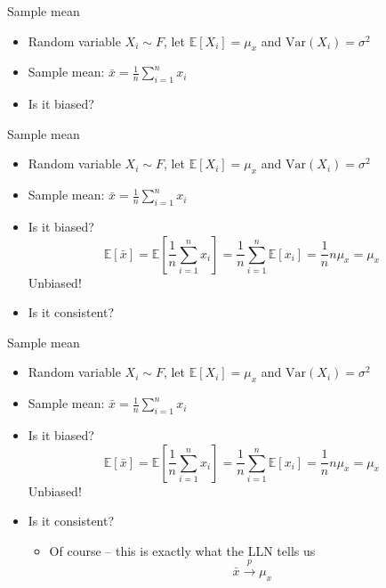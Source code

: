 \documentclass[aspectratio=169]{beamer}
\begin{document}
\begin{frame}{Sample mean}
    \begin{itemize}
        \item Random variable $X_i \sim F$, let $\mathbb{E} [X_i] = \mu_x$ and $\text{Var}(X_i) = \sigma^2$
        \item Sample mean: $\bar{x} = \frac{1}{n} \sum_{i=1}^n x_i$
        \item Is it biased?
    \end{itemize}
\end{frame}

\begin{frame}{Sample mean}
    \begin{itemize}
        \item Random variable $X_i \sim F$, let $\mathbb{E} [X_i] = \mu_x$ and $\text{Var}(X_i) = \sigma^2$
        \item Sample mean: $\bar{x} = \frac{1}{n} \sum_{i=1}^n x_i$
        \item Is it biased?
        $$
        \mathbb{E}[\bar{x}] = \mathbb{E}\left[\frac{1}{n} \sum_{i=1}^n x_i\right] = \frac{1}{n} \sum_{i=1}^n \mathbb{E}[x_i] = \frac{1}{n} n \mu_x = \mu_x
        $$
        Unbiased!
        \item Is it consistent?
    \end{itemize}
\end{frame}

\begin{frame}{Sample mean}
    \begin{itemize}
        \item Random variable $X_i \sim F$, let $\mathbb{E} [X_i] = \mu_x$ and $\text{Var}(X_i) = \sigma^2$
        \item Sample mean: $\bar{x} = \frac{1}{n} \sum_{i=1}^n x_i$
        \item Is it biased?
        $$
        \mathbb{E}[\bar{x}] = \mathbb{E}\left[\frac{1}{n} \sum_{i=1}^n x_i\right] = \frac{1}{n} \sum_{i=1}^n \mathbb{E}[x_i] = \frac{1}{n} n \mu_x = \mu_x
        $$
        Unbiased!
        \item Is it consistent?
        \begin{itemize}
            \item Of course -- this is exactly what the LLN tells us
            $$
                \bar{x} \xrightarrow{p} \mu_x
            $$
        \end{itemize}
    \end{itemize}
\end{frame}
\end{document}

